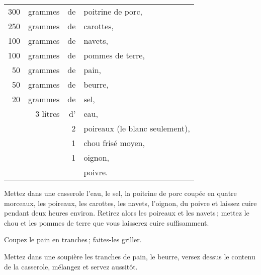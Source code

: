 \footnotesize
\begin{longtable}{rrrp{16em}}                                                    
    300 & grammes  & de & poitrine de porc,                                                               \\
    250 & grammes  & de & carottes,                                                                       \\
    100 & grammes  & de & navets,                                                                         \\
    100 & grammes  & de & pommes de terre,                                                                \\
     50 & grammes  & de & pain,                                                                           \\
     50 & grammes  & de & beurre,                                                                         \\
     20 & grammes  & de & sel,                                                                            \\
        & 3 litres & d' & eau,                                                                            \\
        &          &  2 & poireaux (le blanc seulement),                                                  \\
        &          &  1 & chou frisé moyen,                                                               \\
        &          &  1 & oignon,                                                                         \\
        &          &    & poivre.                                                                         \\
\end{longtable}
\normalsize

Mettez dans une casserole l'eau, le sel, la poitrine de porc coupée en quatre
morceaux, les poireaux, les carottes, les navets, l'oignon, du poivre et laissez
cuire pendant deux heures environ. Retirez alors les poireaux et les navets ; mettez
le chou et les pommes de terre que vous laisserez cuire suffisamment.

Coupez le pain en tranches ; faites-les griller.

Mettez dans une soupière les tranches de pain, le beurre, versez dessus le
contenu de la casserole, mélangez et servez aussitôt.

